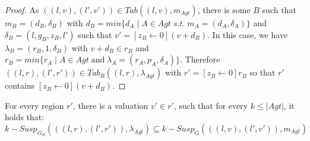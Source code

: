 \begin{proof}
As $((l, v), (l', v')) \in Tab((l, v), m_{Agt})$, there is some $B$ such that $m_{B} = (d_{B}, \delta_{B})$ with $d_{B} = min\lbrace d_{A} \; \vert \; A \in Agt \; s.t. \; m_{A} = (d_{A}, \delta_{A}) \rbrace$ and $\delta_{B} = (l, g_{B}, z_{B}, l')$ such that $v' = [z_{B} \leftarrow 0](v + d_{B})$. In this case, we have $\lambda_{B} = (r_{B}, 1, \delta_{B})$ with $v + d_{B} \in r_{B}$ and $r_{B} = min\lbrace r_{A} \; \vert \; A \in Agt \; \text{and} \; \lambda_{A} = (r_{A}, p_{A}, \delta_{A}) \rbrace$. Therefore $((l, r), (l', r')) \in Tab_{R}((l, r), \lambda_{Agt})$ with $r' = [z_{B} \leftarrow 0]r_{B}$ so that $r'$ contains $[z_{B} \leftarrow 0](v + d_{B})$.
\end{proof}

\begin{lemma}
\label{lemma10}
For every region $r'$, there is a valuation $v' \in r'$, such that for every $k \leq \vert Agt \vert$, it holds that:
\[k-Susp_{G_{R}}(((l, r), (l', r')), \lambda_{Agt}) \subseteq k-Susp_{G}(((l, v), (l', v')), m_{Agt})\]
\end{lemma}

